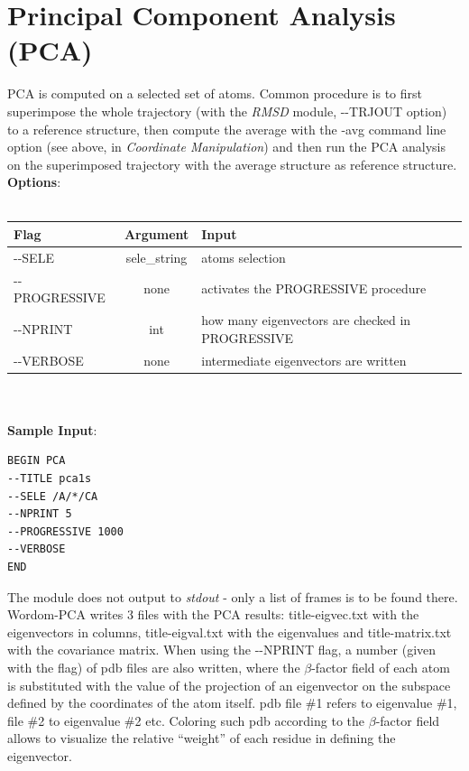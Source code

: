 \documentclass[11pt,twoside,onecolumn,a4paper,openright,notitlepage]{book}[2001/04/21]
\begin{document}
\section{Principal Component Analysis (PCA)}
PCA is computed on a selected set of atoms. Common procedure is to first superimpose the whole trajectory (with the \emph{RMSD} module, -{}-TRJOUT option) to a reference structure, then compute the average with the -avg command line option (see above, in \emph{Coordinate Manipulation}) and then run the PCA analysis on the superimposed trajectory with the average structure as reference structure.\\

\textbf{\large Options}:\\\\
\begin{tabular}{l|c|p{8.0cm}}
Flag & Argument & Input \\
\hline
-{}-SELE          & sele\_string  & atoms selection\\
-{}-PROGRESSIVE   & none  & activates the PROGRESSIVE procedure\\
-{}-NPRINT        & int   & how many eigenvectors are checked in PROGRESSIVE\\
-{}-VERBOSE       & none  & intermediate eigenvectors are written\\
\end{tabular}\\\\

\textbf{\large Sample Input}:
\begin{verbatim}
BEGIN PCA
--TITLE pca1s
--SELE /A/*/CA
--NPRINT 5
--PROGRESSIVE 1000
--VERBOSE
END
\end{verbatim}

The module does not output to \emph{stdout} - only a list of frames is to be found there. Wordom-PCA writes 3 files with the PCA results: title-eigvec.txt with the eigenvectors in columns, title-eigval.txt with the eigenvalues and title-matrix.txt with the covariance matrix. When using the -{}-NPRINT flag, a number (given with the flag) of pdb files are also written, where the $\beta{}$-factor field of each atom is substituted with the value of the projection of an eigenvector on the subspace defined by the coordinates of the atom itself. pdb file \#1 refers to eigenvalue \#1, file \#2 to eigenvalue \#2 etc. Coloring such pdb according to the $\beta{}$-factor field allows to visualize the relative ``weight'' of each residue in defining the eigenvector.
\end{document}

